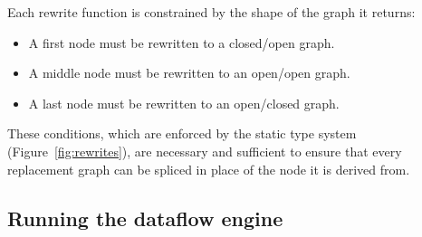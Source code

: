 \documentclass[blockstyle,preprint,natbib,nocopyrightspace]{sigplanconf}
\def\finalremark#1{\relax}
\newcommand\delendum[1]{\relax\ifvmode\else\unskip\fi\relax}
\newcommand\figref[1]{Figure~\ref{fig:#1}}
\begin{document}
Each rewrite function is constrained by the shape of the graph it returns:
\begin{itemize}
\item
\iffalse
A first node with @BlockId@~$L$ must be rewritten to a closed/open
replacement graph which also begins with @BlockId@~$L$.
\delendum{Whoa!  What does it mean to say that a graph ``begins with $L$''?
Perhpas we just mean that the replacement grpah must include a block labelled $L$?}
\else
A first node must be rewritten to a closed/open
 graph.
\finalremark{Revisit graphs ``beginning with $L$''}
\fi
\item
A middle node must be rewritten to an open/open graph.
\item
A last node must be rewritten to an open/closed graph.
\end{itemize}
These conditions, which are enforced by the static type system
 (\figref{rewrites}), 
 are necessary and sufficient to ensure that 
every replacement graph can be spliced in place of the node it is derived from.

\subsection{Running the dataflow engine}
\end{document}
